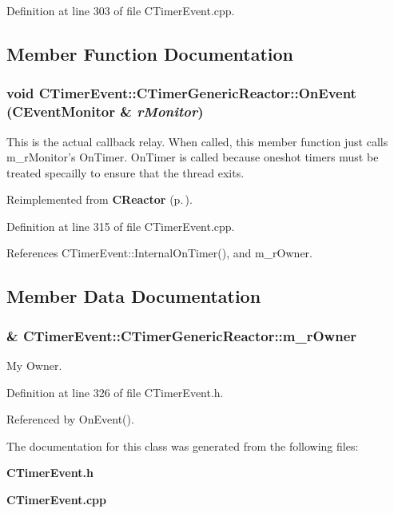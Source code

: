 Definition at line 303 of file CTimer\-Event.cpp.

\subsection{Member Function Documentation}
\subsubsection{\setlength{\rightskip}{0pt plus 5cm}void CTimer\-Event::CTimer\-Generic\-Reactor::On\-Event ({\bf CEvent\-Monitor} \& {\em r\-Monitor})\hspace{0.3cm}{\tt  [virtual]}}\label{classCTimerEvent_1_1CTimerGenericReactor_a2}


This is the actual callback relay. When called, this  member function just calls m\_\-r\-Monitor's On\-Timer. On\-Timer is called because oneshot timers must be treated specailly to ensure that the thread exits. 

Reimplemented from {\bf CReactor} {\rm (p.\,\pageref{classCReactor_a6})}.

Definition at line 315 of file CTimer\-Event.cpp.

References CTimer\-Event::Internal\-On\-Timer(), and m\_\-r\-Owner.

\subsection{Member Data Documentation}
\subsubsection{\& CTimer\-Event::CTimer\-Generic\-Reactor::m\_\-r\-Owner\hspace{0.3cm}{\tt  [private]}}\label{classCTimerEvent_1_1CTimerGenericReactor_o0}


My Owner.



Definition at line 326 of file CTimer\-Event.h.

Referenced by On\-Event().

The documentation for this class was generated from the following files:\begin{CompactItemize}
\item 
{\bf CTimer\-Event.h}\item 
{\bf CTimer\-Event.cpp}\end{CompactItemize}
